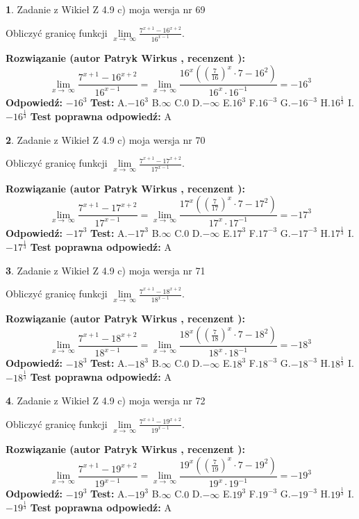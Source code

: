 \documentclass[12pt, a4paper]{article}
\theoremstyle{definition} %
\newtheorem{zad}{}
\newcommand{\zadStart}[1]{\begin{zad}#1\newline}
\newcommand{\zadStop}{\end{zad}}
\newcommand{\rozwStart}[2]{\noindent \textbf{Rozwiązanie (autor #1 , recenzent #2): }\newline}
\newcommand{\rozwStop}{\newline}
\newcommand{\odpStart}{\noindent \textbf{Odpowiedź:}\newline}
\newcommand{\odpStop}{\newline}
\newcommand{\testStart}{\noindent \textbf{Test:}\newline}
\newcommand{\testStop}{\newline}
\newcommand{\kluczStart}{\noindent \textbf{Test poprawna odpowiedź:}\newline}
\newcommand{\kluczStop}{\newline}
\begin{document}
\zadStart{Zadanie z Wikieł Z 4.9 c) moja wersja nr 69}


Obliczyć granicę funkcji  $\lim\limits_{x\to\ \infty}\frac{7^{x+1}-16^{x+2}}{16^{x-1}}$.
\zadStop
\rozwStart{Patryk Wirkus}{}
$$\lim\limits_{x\to\ \infty}\frac{7^{x+1}-16^{x+2}}{16^{x-1}}=\lim\limits_{x\to\ \infty}\frac{16^{x}((\frac{7}{16})^{x}\cdot 7 -16^{2})}{16^{x}\cdot 16^{-1}} = -16^{3}$$
\rozwStop
\odpStart
$-16^{3}$
\odpStop
\testStart
A.$-16^{3}$ B.$\infty$ C.$0$ D.$-\infty$ E.$16^{3}$
F.$16^{-3}$ G.$-16^{-3}$
H.$16^{\frac{1}{3}}$
I.$-16^{\frac{1}{3}}$
\testStop
\kluczStart
A
\kluczStop



\zadStart{Zadanie z Wikieł Z 4.9 c) moja wersja nr 70}


Obliczyć granicę funkcji  $\lim\limits_{x\to\ \infty}\frac{7^{x+1}-17^{x+2}}{17^{x-1}}$.
\zadStop
\rozwStart{Patryk Wirkus}{}
$$\lim\limits_{x\to\ \infty}\frac{7^{x+1}-17^{x+2}}{17^{x-1}}=\lim\limits_{x\to\ \infty}\frac{17^{x}((\frac{7}{17})^{x}\cdot 7 -17^{2})}{17^{x}\cdot 17^{-1}} = -17^{3}$$
\rozwStop
\odpStart
$-17^{3}$
\odpStop
\testStart
A.$-17^{3}$ B.$\infty$ C.$0$ D.$-\infty$ E.$17^{3}$
F.$17^{-3}$ G.$-17^{-3}$
H.$17^{\frac{1}{3}}$
I.$-17^{\frac{1}{3}}$
\testStop
\kluczStart
A
\kluczStop



\zadStart{Zadanie z Wikieł Z 4.9 c) moja wersja nr 71}


Obliczyć granicę funkcji  $\lim\limits_{x\to\ \infty}\frac{7^{x+1}-18^{x+2}}{18^{x-1}}$.
\zadStop
\rozwStart{Patryk Wirkus}{}
$$\lim\limits_{x\to\ \infty}\frac{7^{x+1}-18^{x+2}}{18^{x-1}}=\lim\limits_{x\to\ \infty}\frac{18^{x}((\frac{7}{18})^{x}\cdot 7 -18^{2})}{18^{x}\cdot 18^{-1}} = -18^{3}$$
\rozwStop
\odpStart
$-18^{3}$
\odpStop
\testStart
A.$-18^{3}$ B.$\infty$ C.$0$ D.$-\infty$ E.$18^{3}$
F.$18^{-3}$ G.$-18^{-3}$
H.$18^{\frac{1}{3}}$
I.$-18^{\frac{1}{3}}$
\testStop
\kluczStart
A
\kluczStop



\zadStart{Zadanie z Wikieł Z 4.9 c) moja wersja nr 72}


Obliczyć granicę funkcji  $\lim\limits_{x\to\ \infty}\frac{7^{x+1}-19^{x+2}}{19^{x-1}}$.
\zadStop
\rozwStart{Patryk Wirkus}{}
$$\lim\limits_{x\to\ \infty}\frac{7^{x+1}-19^{x+2}}{19^{x-1}}=\lim\limits_{x\to\ \infty}\frac{19^{x}((\frac{7}{19})^{x}\cdot 7 -19^{2})}{19^{x}\cdot 19^{-1}} = -19^{3}$$
\rozwStop
\odpStart
$-19^{3}$
\odpStop
\testStart
A.$-19^{3}$ B.$\infty$ C.$0$ D.$-\infty$ E.$19^{3}$
F.$19^{-3}$ G.$-19^{-3}$
H.$19^{\frac{1}{3}}$
I.$-19^{\frac{1}{3}}$
\testStop
\kluczStart
A
\kluczStop
\end{document}
